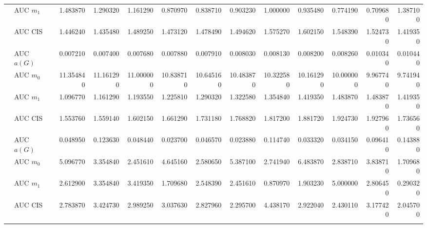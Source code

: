 \begin{table}[htbp]
\begin{tabular}{llrrrrrrrrrrr}
    & AUC $m_1$ & 1.483870 & 1.290320 & 1.161290 & 0.870970 & 0.838710 & 0.903230 & 1.000000 & 0.935480 & 0.774190 & 0.709680 & 1.387100 \\
    & AUC CIS & 1.446240 & 1.435480 & 1.489250 & 1.473120 & 1.478490 & 1.494620 & 1.575270 & 1.602150 & 1.548390 & 1.524730 & 1.419350 \\
    \addlinespace
    \multirow{4}{*}{degree} & AUC $a(G)$ & 0.007210 & 0.007400 & 0.007680 & 0.007880 & 0.007910 & 0.008030 & 0.008130 & 0.008200 & 0.008260 & 0.010340 & 0.010440 \\
    & AUC $m_0$ & 11.354840 & 11.161290 & 11.000000 & 10.838710 & 10.645160 & 10.483870 & 10.322580 & 10.161290 & 10.000000 & 9.967740 & 9.741940 \\
    & AUC $m_1$ & 1.096770 & 1.161290 & 1.193550 & 1.225810 & 1.290320 & 1.322580 & 1.354840 & 1.419350 & 1.483870 & 1.483870 & 1.419350 \\
    & AUC CIS & 1.553760 & 1.559140 & 1.602150 & 1.661290 & 1.731180 & 1.768820 & 1.817200 & 1.881720 & 1.924730 & 1.927960 & 1.736560 \\
    \addlinespace
    \multirow{4}{*}{random} & AUC $a(G)$ & 0.048950 & 0.123630 & 0.048440 & 0.023700 & 0.046570 & 0.023880 & 0.114740 & 0.033320 & 0.034150 & 0.096410 & 0.143880 \\
    & AUC $m_0$ & 5.096770 & 3.354840 & 2.451610 & 4.645160 & 2.580650 & 5.387100 & 2.741940 & 6.483870 & 2.838710 & 3.838710 & 1.709680 \\
    & AUC $m_1$ & 2.612900 & 3.354840 & 3.419350 & 1.709680 & 2.548390 & 2.451610 & 0.870970 & 1.903230 & 5.000000 & 2.806450 & 0.290320 \\
    & AUC CIS & 2.783870 & 3.424730 & 2.989250 & 3.037630 & 2.827960 & 2.295700 & 4.438170 & 2.922040 & 2.430110 & 3.177420 & 2.045700 \\
    \addlinespace
    \bottomrule
  \end{tabular}
\end{table}

